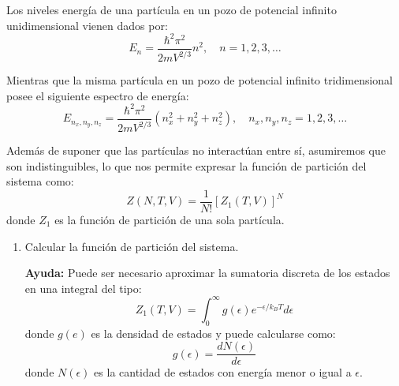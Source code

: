 \documentclass[a4paper,11pt]{article}
\begin{document}
Los niveles energía de una partícula en un pozo de potencial infinito 
unidimensional vienen dados por:
$$ E_n = \frac{\hbar^2 \pi^2}{2m V^{2/3}} n^2, \quad n=1, 2, 3, \dots $$

\noindent Mientras que la misma partícula en un pozo de potencial infinito 
tridimensional posee el siguiente espectro de energía:
$$ E_{n_x, n_y, n_z} = \frac{\hbar^2 \pi^2}{2m V^{2/3}} (n_x^2 + n_y^2 + n_z^2),
\quad n_x, n_y, n_z = 1, 2, 3, \dots $$


Además de suponer que las partículas no interactúan entre sí, 
asumiremos que son indistinguibles, lo que nos permite expresar la 
función de partición del sistema como:
$$ Z(N,T,V) = \frac{1}{N!} [Z_1(T, V)]^N $$
donde $Z_1$ es la función de partición de una sola partícula.


\begin{enumerate}[label=(\alph*),
                  leftmargin=2\parindent,
                  rightmargin=2\parindent]

    \item{Calcular la función de partición del sistema.}
    
    {\small
    \textbf{Ayuda:} Puede ser necesario aproximar la sumatoria 
    discreta de los estados en una integral del tipo:
    $$ Z_1(T, V) =
    \int_0^\infty g(\epsilon) e^{-\epsilon/k_B T} d\epsilon $$
    donde $g(e)$ es la densidad de estados y puede calcularse como:
    $$ g(\epsilon) = \frac{d N(\epsilon)}{d\epsilon} $$
    donde $N(\epsilon)$ es la cantidad de estados con energía menor o 
    igual a $\epsilon$.
    }

\end{enumerate}
\end{document}
